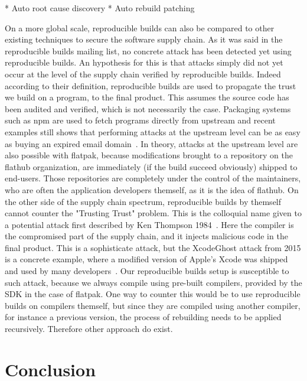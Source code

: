 \documentclass[a4paper,11pt,oneside]{report}
\theoremstyle{definition}
\newcommand{\rb}{reproducible builds\xspace}
\newcommand{\fp}{flatpak\xspace}
\newcommand{\fh}{flathub\xspace}
\begin{document}
* Auto root cause discovery
* Auto rebuild patching

On a more global scale, \rb can also be compared to other existing techniques
to secure the software supply chain. As it was said in the \rb mailing list, no
concrete attack has been detected yet using \rb. An hypothesis for this is that
attacks simply did not yet occur at the level of the supply chain verified by
\rb. Indeed according to their definition, \rb are used to propagate the trust
we build on a program, to the final product. This assumes the source code has
been audited and verified, which is not necessarily the case. Packaging systems
such as npm are used to fetch programs directly from upstream and recent
examples still shows that performing attacks at the upstream level can be as
easy as buying an expired email domain~\cite{npm:ptdr}.
In theory, attacks at the upstream level are also possible with \fp, because
modifications brought to a repository on the \fh organization, are immediately
(if the build succeed obviously) shipped to end-users. Those repositories are
completely under the control of the maintainers, who are often the application
developers themself, as it is the idea of \fh.
On the other side of the supply chain spectrum, \rb by themself cannot counter
the "Trusting Trust" problem. This is the colloquial name given to a potential
attack first described by Ken Thompson 1984~\cite{thompson1984}. Here the
compiler is the compromised part of the supply chain, and it injects malicious
code in the final product. This is a sophisticate attack, but the XcodeGhost
attack from 2015 is a concrete example, where a modified version of Apple's
Xcode was shipped and used by many developers~\cite{enwiki:1054394297}. Our \rb
setup is susceptible to such attack, because we always compile using pre-built
compilers, provided by the SDK in the case of \fp. One way to counter this would
be to use \rb on compilers themself, but since they are compiled using another
compiler, for instance a previous version, the process of rebuilding needs to
be applied recursively. Therefore other approach do exist.

\chapter{Conclusion}

\cleardoublepage
{}
{}
\printbibliography
\end{document}
